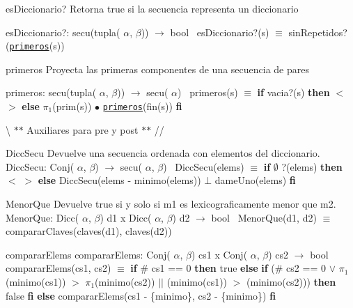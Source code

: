 \begin{DoxyParagraph}{es\+Diccionario?}
Retorna true si la secuencia representa un diccionario

es\+Diccionario?\+: secu(tupla( $\alpha$, $\beta$)) $\to$ bool~\newline
 es\+Diccionario?(s) $\equiv$ sin\+Repetidos?(\href{axiomas.html#primeros}{\tt primeros}(s)) 
\end{DoxyParagraph}


\begin{DoxyParagraph}{primeros}
Proyecta las primeras componentes de una secuencia de pares

primeros\+: secu(tupla( $\alpha$, $\beta$)) $\to$ secu( $\alpha$)~\newline
 primeros(s) $\equiv$ {\bfseries if} vacia?(s) {\bfseries then} $<$$>$ {\bfseries else} $\pi_1$(prim(s)) $\bullet$ \href{axiomas.html#primeros}{\tt primeros}(fin(s)) {\bfseries fi} 
\end{DoxyParagraph}


\textbackslash{} $\ast$$\ast$ Auxiliares para pre y post $\ast$$\ast$ // \begin{DoxyParagraph}{Dicc\+Secu}
Devuelve una secuencia ordenada con elementos del diccionario. Dicc\+Secu\+: Conj( $\alpha$, $\beta$) $\to$ secu( $\alpha$, $\beta$)~\newline
 Dicc\+Secu(elems) $\equiv$ {\bfseries if} $\emptyset$ ?(elems) {\bfseries then} $<$ $>$ {\bfseries else} Dicc\+Secu(elems -\/ minimo(elems)) $\bot$ dame\+Uno(elems) {\bfseries fi} 
\end{DoxyParagraph}


\begin{DoxyParagraph}{Menor\+Que}
Devuelve true si y solo si m1 es lexicograficamente menor que m2. Menor\+Que\+: Dicc( $\alpha$, $\beta$) d1 x Dicc( $\alpha$, $\beta$) d2 $\to$ bool~\newline
 Menor\+Que(d1, d2) $\equiv$ comparar\+Claves(claves(d1), claves(d2)) 
\end{DoxyParagraph}


\begin{DoxyParagraph}{comparar\+Elems}
comparar\+Elems\+: Conj( $\alpha$, $\beta$) cs1 x Conj( $\alpha$, $\beta$) cs2 $\to$ bool~\newline
 comparar\+Elems(cs1, cs2) $\equiv$ {\bfseries if} \# cs1 == 0 {\bfseries then} true {\bfseries else} {\bfseries if} (\# cs2 == 0 $\lor$ $\pi_1$(minimo(cs1)) $>$ $\pi_1$(minimo(cs2)) $\vert$$\vert$ (minimo(cs1)) $>$ (minimo(cs2))) {\bfseries then} false {\bfseries fi} {\bfseries else} comparar\+Elems(cs1 -\/ \{minimo\}, cs2 -\/ \{minimo\}) {\bfseries fi} 
\end{DoxyParagraph}


